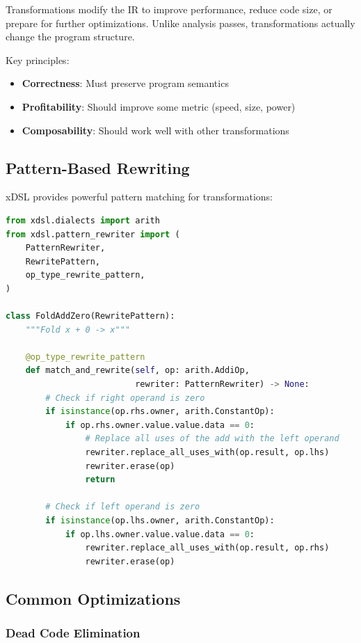 \documentclass[11pt,a4paper]{article}
\begin{document}
Transformations modify the IR to improve performance, reduce code size, or prepare for further optimizations. Unlike analysis passes, transformations actually change the program structure.

Key principles:
\begin{itemize}
    \item \textbf{Correctness}: Must preserve program semantics
    \item \textbf{Profitability}: Should improve some metric (speed, size, power)
    \item \textbf{Composability}: Should work well with other transformations
\end{itemize}

\subsection{Pattern-Based Rewriting}

xDSL provides powerful pattern matching for transformations:

\begin{lstlisting}[language=Python, caption=Simple Algebraic Optimization]
from xdsl.dialects import arith
from xdsl.pattern_rewriter import (
    PatternRewriter,
    RewritePattern,
    op_type_rewrite_pattern,
)

class FoldAddZero(RewritePattern):
    """Fold x + 0 -> x"""

    @op_type_rewrite_pattern
    def match_and_rewrite(self, op: arith.AddiOp,
                          rewriter: PatternRewriter) -> None:
        # Check if right operand is zero
        if isinstance(op.rhs.owner, arith.ConstantOp):
            if op.rhs.owner.value.value.data == 0:
                # Replace all uses of the add with the left operand
                rewriter.replace_all_uses_with(op.result, op.lhs)
                rewriter.erase(op)
                return

        # Check if left operand is zero
        if isinstance(op.lhs.owner, arith.ConstantOp):
            if op.lhs.owner.value.value.data == 0:
                rewriter.replace_all_uses_with(op.result, op.rhs)
                rewriter.erase(op)
\end{lstlisting}

\subsection{Common Optimizations}

\subsubsection{Dead Code Elimination}
\end{document}

